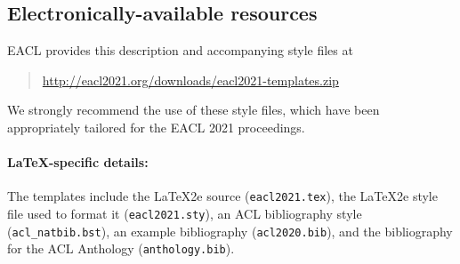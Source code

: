 \subsection{Electronically-available resources}

EACL provides this description and accompanying style files at
\begin{quote}
	\url{http://eacl2021.org/downloads/eacl2021-templates.zip}
\end{quote}
We strongly recommend the use of these style files, which have been appropriately tailored for the EACL 2021 proceedings.

\paragraph{\LaTeX-specific details:}
The templates include the \LaTeX2e{} source (\texttt{\small eacl2021.tex}),
the \LaTeX2e{} style file used to format it (\texttt{\small eacl2021.sty}),
an ACL bibliography style (\texttt{\small acl\_natbib.bst}),
an example bibliography (\texttt{\small acl2020.bib}),
and the bibliography for the ACL Anthology (\texttt{\small anthology.bib}).

